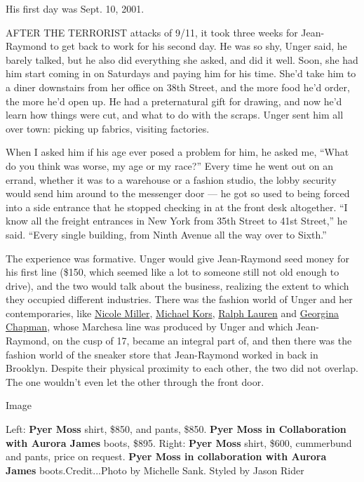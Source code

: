 His first day was Sept. 10, 2001.

AFTER THE TERRORIST attacks of 9/11, it took three weeks for
Jean-Raymond to get back to work for his second day. He was so shy,
Unger said, he barely talked, but he also did everything she asked, and
did it well. Soon, she had him start coming in on Saturdays and paying
him for his time. She'd take him to a diner downstairs from her office
on 38th Street, and the more food he'd order, the more he'd open up. He
had a preternatural gift for drawing, and now he'd learn how things were
cut, and what to do with the scraps. Unger sent him all over town:
picking up fabrics, visiting factories.

When I asked him if his age ever posed a problem for him, he asked me,
``What do you think was worse, my age or my race?'' Every time he went
out on an errand, whether it was to a warehouse or a fashion studio, the
lobby security would send him around to the messenger door --- he got so
used to being forced into a side entrance that he stopped checking in at
the front desk altogether. ``I know all the freight entrances in New
York from 35th Street to 41st Street,'' he said. ``Every single
building, from Ninth Avenue all the way over to Sixth.''

The experience was formative. Unger would give Jean-Raymond seed money
for his first line (\$150, which seemed like a lot to someone still not
old enough to drive), and the two would talk about the business,
realizing the extent to which they occupied different industries. There
was the fashion world of Unger and her contemporaries, like
\href{https://www.nicolemiller.com/}{Nicole Miller},
\href{https://www.nytimes3xbfgragh.onion/2018/04/09/t-magazine/michael-kors-80s-photos-inspiration.html}{Michael
Kors},
\href{https://www.nytimes3xbfgragh.onion/2016/08/18/t-magazine/fashion/ralph-lauren-womens-watch.html}{Ralph
Lauren} and
\href{https://www.nytimes3xbfgragh.onion/2018/05/10/fashion/marchesa-harvey-weinstein.html}{Georgina
Chapman}, whose Marchesa line was produced by Unger and which
Jean-Raymond, on the cusp of 17, became an integral part of, and then
there was the fashion world of the sneaker store that Jean-Raymond
worked in back in Brooklyn. Despite their physical proximity to each
other, the two did not overlap. The one wouldn't even let the other
through the front door.

Image

Left: \textbf{Pyer Moss} shirt, \$850, and pants, \$850. \textbf{Pyer
Moss in Collaboration with Aurora James} boots, \$895. Right:
\textbf{Pyer Moss} shirt, \$600, cummerbund and pants, price on request.
\textbf{Pyer Moss in collaboration with Aurora James}
boots.Credit...Photo by Michelle Sank. Styled by Jason Rider

